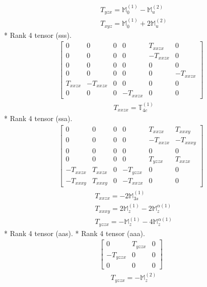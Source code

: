 \documentclass[fleqn,8pt,landscape]{jsarticle}
\begin{document}
\begin{align*}
& T_{yzx} = \mathbb{M}_{0}^{(1)} - \mathbb{M}_{u}^{(2)} \\
& T_{xyz} = \mathbb{M}_{0}^{(1)} + 2 \mathbb{M}_{u}^{(2)}
\end{align*}
* Rank 4 tensor (sss).
\begin{align*}
\begin{bmatrix} 0 & 0 & 0 & 0 & T_{xxzx} & 0 \\ 0 & 0 & 0 & 0 & - T_{xxzx} & 0 \\ 0 & 0 & 0 & 0 & 0 & 0 \\ 0 & 0 & 0 & 0 & 0 & - T_{xxzx} \\ T_{xxzx} & - T_{xxzx} & 0 & 0 & 0 & 0 \\ 0 & 0 & 0 & - T_{xxzx} & 0 & 0 \end{bmatrix}
\end{align*}
\begin{align*}
& T_{xxzx} = \mathbb{T}_{4c}^{(1)}
\end{align*}
* Rank 4 tensor (ssa).
\begin{align*}
\begin{bmatrix} 0 & 0 & 0 & 0 & T_{xxzx} & T_{xxxy} \\ 0 & 0 & 0 & 0 & - T_{xxzx} & - T_{xxxy} \\ 0 & 0 & 0 & 0 & 0 & 0 \\ 0 & 0 & 0 & 0 & T_{yzzx} & T_{xxzx} \\ - T_{xxzx} & T_{xxzx} & 0 & - T_{yzzx} & 0 & 0 \\ - T_{xxxy} & T_{xxxy} & 0 & - T_{xxzx} & 0 & 0 \end{bmatrix}
\end{align*}
\begin{align*}
& T_{xxzx} = - 2 \mathbb{M}_{3s}^{(1)} \\
& T_{xxxy} = 2 \mathbb{M}_{z}^{(1)} - 2 \mathbb{M}_{z}^{\alpha(1)} \\
& T_{yzzx} = - \mathbb{M}_{z}^{(1)} - 4 \mathbb{M}_{z}^{\alpha(1)}
\end{align*}
* Rank 4 tensor (aas).
* Rank 4 tensor (aaa).
\begin{align*}
\begin{bmatrix} 0 & T_{yzzx} & 0 \\ - T_{yzzx} & 0 & 0 \\ 0 & 0 & 0 \end{bmatrix}
\end{align*}
\begin{align*}
& T_{yzzx} = - \mathbb{M}_{z}^{(2)}
\end{align*}
\end{document}
